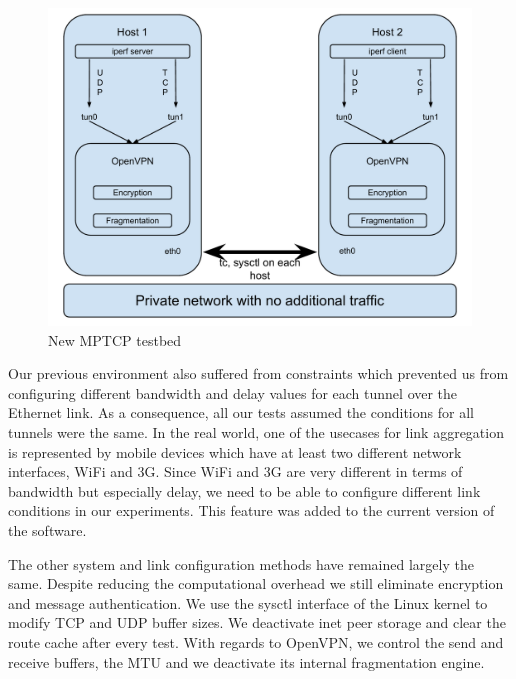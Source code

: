 \begin{figure}[h]
  \centering
  \includegraphics[width=\textwidth]{img/mptcp-openvpn-bare}
  \caption{New MPTCP testbed}
  \label{fig:testbed}
\end{figure}

Our previous environment also suffered from constraints which prevented us from configuring different bandwidth and delay values for each tunnel over the Ethernet link. As a consequence, all our tests assumed the conditions for all tunnels were the same. In the real world, one of the usecases for link aggregation is represented by mobile devices which have at least two different network interfaces, WiFi and 3G. Since WiFi and 3G are very different in terms of bandwidth but especially delay, we need to be able to configure different link conditions in our experiments. This feature was added to the current version of the software.

The other system and link configuration methods have remained largely the
same. Despite reducing the computational overhead we still eliminate
encryption and message authentication. We use the sysctl interface of the
Linux kernel to modify TCP and UDP buffer sizes. We deactivate inet peer
storage and clear the route cache after every test. With regards to OpenVPN,
we control the send and receive buffers, the MTU and we deactivate its
internal fragmentation engine.
